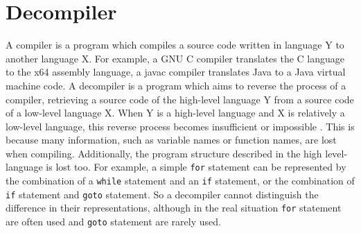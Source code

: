 \documentclass[senior,final,11pt]{iscs-thesis}
\begin{document}
\section{Decompiler}


A compiler is a program which compiles a source code written in language Y to another language X. 
For example, a GNU C compiler translates the C language to the x64 assembly language, a javac compiler translates Java to a Java virtual machine code.
A decompiler is a program which aims to reverse the process of a compiler, retrieving a source code of the high-level language Y from a source code of a low-level language X. 
When Y is a high-level language and X is relatively a low-level language, 
this reverse process becomes insufficient or impossible
\citep{hex_rays,decompile_hard_java}.
This is because many information, such as variable names or function names, are lost when compiling.
Additionally, the program structure described in the high level-language is lost too. 
For example, a simple \texttt{for} statement can be represented by the combination of a \texttt{while} statement and an \texttt{if} statement, or the combination of \texttt{if} statement and \texttt{goto} statement. 
So a decompiler cannot distinguish the difference in their representations, 
although in the real situation \texttt{for} statement are often used and \texttt{goto} statement are rarely used.





\end{document}
